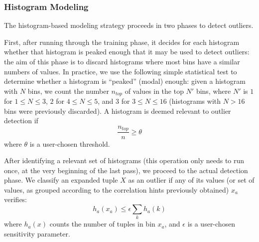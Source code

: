 \subsubsection{Histogram Modeling}
The histogram-based modeling strategy proceeds in two phases to detect outliers. 

First, after running through the training phase, it decides for each histogram whether that histogram is peaked enough that it may be used to detect outliers: the aim of this phase is to discard histograms where most bins have a similar numbers of values. In practice, we use the following simple statistical test to determine whether a histogram is ``peaked'' (modal) enough: given a histogram with $N$ bins, we count the number $n_{top}$ of values in the top $N'$ bins, where $N'$ is $1$ for $1 \leq N \leq 3$, $2$ for $4 \leq N \leq 5$, and $3$ for $3 \leq N \leq 16$ (histograms with $N > 16$ bins were previously discarded). A histogram is deemed relevant to outlier detection if
\[ \frac{n_{top}}{n} \geq \theta \]
where $\theta$ is a user-chosen threshold. 

After identifying a relevant set of histograms (this operation only needs to run once, at the very beginning of the last pass), we proceed to the actual detection phase. We classify an expanded tuple $X$ as an outlier if any of its values (or set of values, as grouped according to the correlation hints previously obtained) $x_a$ verifies:
\[h_a(x_a) \le \epsilon \sum_k h_a(k)\]
where $h_a(x)$ counts the number of tuples in bin $x_a$, and $\epsilon$ is a user-chosen sensitivity parameter.